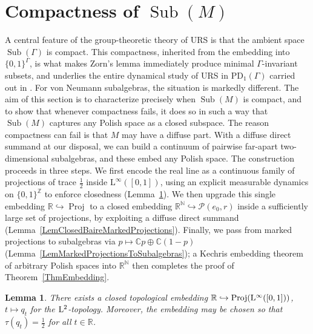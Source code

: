 \documentclass[12pt]{amsart} %
\theoremstyle{plain}
\newtheorem{lemma}[theorem]{Lemma}
\theoremstyle{definition}
\newcommand{\R}{\mathbb{R}}
\newcommand{\C}{\mathbb{C}}
\newcommand{\N}{\mathbb{N}}
\newcommand{\Z}{\mathbb{Z}}
\DeclareMathOperator{\Sub}{Sub}
\DeclareMathOperator{\Proj}{Proj}
\begin{document}
\section{Compactness of \texorpdfstring{$\Sub(M)$}{}}
\label{sec:compactness}
A central feature of the group-theoretic theory of URS is that the ambient space $\Sub(\Gamma)$ is compact. This compactness, inherited from the embedding into $\{0,1\}^\Gamma$, is what makes Zorn's lemma immediately produce minimal $\Gamma$-invariant subsets, and underlies the entire dynamical study of URS in $\mathrm{PD}_1(\Gamma)$ carried out in \cite{AJ}.
For von Neumann subalgebras, the situation is markedly different. The aim of this section is to characterize precisely when $\Sub(M)$ is compact, and to show that whenever compactness fails, it does so in such a way that $\Sub(M)$ captures any Polish space as a closed subspace. The reason compactness can fail is that $M$ may have a diffuse part. With a diffuse direct summand at our disposal, we can build a continuum of pairwise far-apart two-dimensional subalgebras, and these embed any Polish space.
The construction proceeds in three steps. We first encode the real line as a continuous family of projections of trace $\tfrac12$ inside $\mathrm{L}^\infty([0,1])$, using an explicit measurable dynamics on $\{0,1\}^\Z$ to enforce closedness (Lemma~\ref{LemClosedLineProjections}). We then upgrade this single embedding $\R \hookrightarrow \Proj$ to a closed embedding $\R^\N \hookrightarrow \mathcal P(e_0,r)$ inside a sufficiently large set of projections, by exploiting a diffuse direct summand (Lemma~\ref{LemClosedBaireMarkedProjections}). Finally, we pass from marked projections to subalgebras via $p \mapsto \C p \oplus \C(1-p)$ (Lemma~\ref{LemMarkedProjectionsToSubalgebras}); a Kechris embedding theorem of arbitrary Polish spaces into $\R^\N$ then completes the proof of Theorem~\ref{ThmEmbedding}.
\begin{lemma}
\label{LemClosedLineProjections}
There exists a closed topological embedding $\mathbb R\hookrightarrow \Proj({\rm L}^\infty([0,1]))$, $t\mapsto q_t$
for the \({\rm L}^2\)-topology. Moreover, the embedding may be chosen so that $\tau(q_t)=\frac12$ for all $t\in\R$.
\end{lemma}
\end{document}
